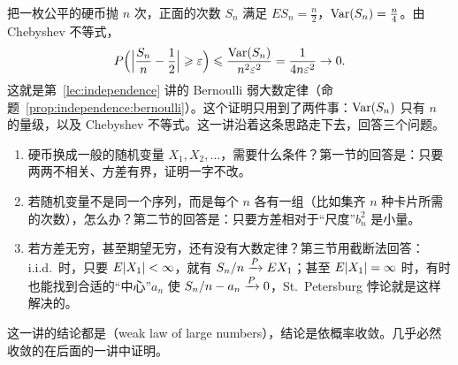 \label{lec:weak-laws}

把一枚公平的硬币抛 $n$ 次，正面的次数 $S_n$ 满足 $ES_n=\frac n2$，$\operatorname{Var}(S_n)=\frac n4$。由 Chebyshev 不等式，
\[
P\Bigl(\Bigl\lvert\frac{S_n}n-\frac12\Bigr\rvert\geqslant\varepsilon\Bigr)\leqslant\frac{\operatorname{Var}(S_n)}{n^2\varepsilon^2}=\frac1{4n\varepsilon^2}\to0 .
\]
这就是第~\ref{lec:independence} 讲的 Bernoulli 弱大数定律（命题~\ref{prop:independence:bernoulli}）。这个证明只用到了两件事：$\operatorname{Var}(S_n)$ 只有 $n$ 的量级，以及 Chebyshev 不等式。这一讲沿着这条思路走下去，回答三个问题。
\begin{enumerate}
\item 硬币换成一般的随机变量 $X_1,X_2,\dots$，需要什么条件？第一节的回答是：只要两两不相关、方差有界，证明一字不改。
\item 若随机变量不是同一个序列，而是每个 $n$ 各有一组（比如集齐 $n$ 种卡片所需的次数），怎么办？第二节的回答是：只要方差相对于“尺度”$b_n^2$ 是小量。
\item 若方差无穷，甚至期望无穷，还有没有大数定律？第三节用截断法回答：i.i.d.\ 时，只要 $E\lvert X_1\rvert<\infty$，就有 $S_n/n\xrightarrow{P} EX_1$；甚至 $E\lvert X_1\rvert=\infty$ 时，有时也能找到合适的“中心”$a_n$ 使 $S_n/n-a_n\xrightarrow{P}0$，St.\ Petersburg 悖论就是这样解决的。
\end{enumerate}
这一讲的结论都是（weak law of large numbers），结论是依概率收敛。几乎必然收敛的在后面的一讲中证明。


